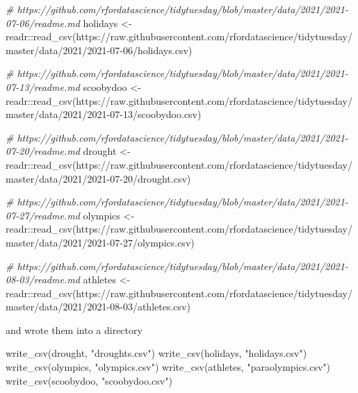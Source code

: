 \documentclass[
]{article}
\newenvironment{Shaded}{\begin{snugshade}}{\end{snugshade}}
\newcommand{\CommentTok}[1]{\textcolor[rgb]{0.56,0.35,0.01}{\textit{#1}}}
\newcommand{\FunctionTok}[1]{\textcolor[rgb]{0.00,0.00,0.00}{#1}}
\newcommand{\NormalTok}[1]{#1}
\newcommand{\OtherTok}[1]{\textcolor[rgb]{0.56,0.35,0.01}{#1}}
\newcommand{\SpecialCharTok}[1]{\textcolor[rgb]{0.00,0.00,0.00}{#1}}
\newcommand{\StringTok}[1]{\textcolor[rgb]{0.31,0.60,0.02}{#1}}
\begin{document}
\begin{Shaded}
\begin{Highlighting}[]
\CommentTok{\# https://github.com/rfordatascience/tidytuesday/blob/master/data/2021/2021{-}07{-}06/readme.md}
\NormalTok{holidays }\OtherTok{\textless{}{-}}\NormalTok{ readr}\SpecialCharTok{::}\FunctionTok{read\_csv}\NormalTok{(}\StringTok{\textquotesingle{}https://raw.githubusercontent.com/rfordatascience/tidytuesday/master/data/2021/2021{-}07{-}06/holidays.csv\textquotesingle{}}\NormalTok{)}

\CommentTok{\# https://github.com/rfordatascience/tidytuesday/blob/master/data/2021/2021{-}07{-}13/readme.md}
\NormalTok{scoobydoo }\OtherTok{\textless{}{-}}\NormalTok{ readr}\SpecialCharTok{::}\FunctionTok{read\_csv}\NormalTok{(}\StringTok{\textquotesingle{}https://raw.githubusercontent.com/rfordatascience/tidytuesday/master/data/2021/2021{-}07{-}13/scoobydoo.csv\textquotesingle{}}\NormalTok{)}

\CommentTok{\# https://github.com/rfordatascience/tidytuesday/blob/master/data/2021/2021{-}07{-}20/readme.md}
\NormalTok{drought }\OtherTok{\textless{}{-}}\NormalTok{ readr}\SpecialCharTok{::}\FunctionTok{read\_csv}\NormalTok{(}\StringTok{\textquotesingle{}https://raw.githubusercontent.com/rfordatascience/tidytuesday/master/data/2021/2021{-}07{-}20/drought.csv\textquotesingle{}}\NormalTok{)}

\CommentTok{\# https://github.com/rfordatascience/tidytuesday/blob/master/data/2021/2021{-}07{-}27/readme.md}
\NormalTok{olympics }\OtherTok{\textless{}{-}}\NormalTok{ readr}\SpecialCharTok{::}\FunctionTok{read\_csv}\NormalTok{(}\StringTok{\textquotesingle{}https://raw.githubusercontent.com/rfordatascience/tidytuesday/master/data/2021/2021{-}07{-}27/olympics.csv\textquotesingle{}}\NormalTok{)}

\CommentTok{\# https://github.com/rfordatascience/tidytuesday/blob/master/data/2021/2021{-}08{-}03/readme.md}
\NormalTok{athletes }\OtherTok{\textless{}{-}}\NormalTok{ readr}\SpecialCharTok{::}\FunctionTok{read\_csv}\NormalTok{(}\StringTok{\textquotesingle{}https://raw.githubusercontent.com/rfordatascience/tidytuesday/master/data/2021/2021{-}08{-}03/athletes.csv\textquotesingle{}}\NormalTok{)}
\end{Highlighting}
\end{Shaded}

and wrote them into a directory

\begin{Shaded}
\begin{Highlighting}[]
\FunctionTok{write\_csv}\NormalTok{(drought, }\StringTok{"droughts.csv"}\NormalTok{)}
\FunctionTok{write\_csv}\NormalTok{(holidays, }\StringTok{"holidays.csv"}\NormalTok{)}
\FunctionTok{write\_csv}\NormalTok{(olympics, }\StringTok{"olympics.csv"}\NormalTok{)}
\FunctionTok{write\_csv}\NormalTok{(athletes, }\StringTok{"paraolympics.csv"}\NormalTok{)}
\FunctionTok{write\_csv}\NormalTok{(scoobydoo, }\StringTok{"scoobydoo.csv"}\NormalTok{)}
\end{Highlighting}
\end{Shaded}
\end{document}
